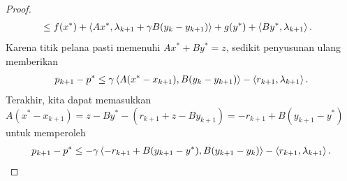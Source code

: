 \begin{proof}
\begin{equation}
\begin{aligned}
            &\leq
            f(x^*) + \left\langle Ax^* , \lambda_{k+1} + \gamma B(y_k-y_{k+1})\right\rangle + g(y^*) + \left\langle By^* , \lambda_{k+1}\right\rangle.
        \end{aligned}
    \end{equation}
    Karena titik pelana pasti memenuhi $Ax^* + By^* = z$, sedikit penyusunan ulang memberikan
    \begin{equation}
        \begin{aligned}
            p_{k+1} - p^*
            \leq \gamma \left\langle A (x^*-x_{k+1}) , B(y_k-y_{k+1})\right\rangle - \left\langle r_{k+1} , \lambda_{k+1}\right\rangle.
        \end{aligned}
    \end{equation}
    Terakhir, kita dapat memasukkan $A(x^* - x_{k+1}) = z - By^* - (r_{k+1} + z - By_{k+1}) = -r_{k+1} + B(y_{k+1}-y^*)$ untuk memperoleh
    \begin{equation}\label{duality:eq:proof_admm3}
        \begin{aligned}
            p_{k+1} - p^*
            \leq -\gamma \left\langle-r_{k+1} + B(y_{k+1}-y^*) , B(y_{k+1}-y_k)\right\rangle - \left\langle r_{k+1} , \lambda_{k+1}\right\rangle.
        \end{aligned}
    \end{equation}

\end{proof}
